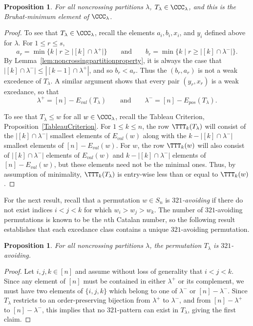 \documentclass[12pt]{amsart}
\newtheorem{prop}[equation]{Proposition}
\theoremstyle{definition}
\theoremstyle{remark}
\numberwithin{equation}{section}
\renewcommand{\setminus}{-}
\newcommand{\EP}{E_{pos}}
\newcommand{\EV}{E_{val}}
\begin{document}
\begin{prop}
\label{prop:321avoid}
For all noncrossing partitions $\lambda$, $T_{\lambda} \in \CCC_{\lambda}$, and this is the Bruhat-minimum element of $\CCC_{\lambda}$.
\end{prop}
\begin{proof}
To see that $T_{\lambda} \in \CCC_{\lambda}$, recall the elements $a_{i}, b_{i}, x_{i}$, and $y_{i}$ defined above for $\lambda$. For $1 \le r \le s$,
\[
a_{r} = \min\{ k  \;|\;  r \ge |[k] \cap \lambda^{+}| \}
\qquad\text{and}\qquad
b_{r} = \min\{ k  \;|\;  r \ge |[k] \cap \lambda^{-}| \}.
\]
By Lemma~\ref{lem:noncrossingpartitionproperty}, it is always the case that $|[k] \cap \lambda^{-}| \le |[k-1] \cap \lambda^{+}|$, and so $b_{r} < a_{r}$.  Thus the $(b_{r}, a_{r})$ is not a weak excedence of $T_{\lambda}$.  
A similar argument shows that every pair $(y_{r}, x_{r})$ is a weak excedance, so that 
\[
\lambda^{+} = [n] \setminus \EV(T_{\lambda})
\qquad\text{and}\qquad
\lambda^{-} =  [n] \setminus \EP(T_{\lambda}).
\]

To see that $T_{\lambda} \le w$ for all $w \in \CCC_{\lambda}$, recall the Tableau Criterion, Proposition~\ref{TableauCriterion}.  
For $1 \le k \le n$, the row $\TTT_{k}(T_{\lambda})$ will consist of the $|[k] \cap \lambda^{-}|$ smallest elements of $\EV(w)$ along with the $k - |[k] \cap \lambda^{-}|$ smallest elements of $[n] \setminus \EV(w)$.  
For $w$,  the row $\TTT_{k}(w)$ will also consist of $|[k] \cap \lambda^{-}|$ elements of $\EV(w)$ and $k - |[k] \cap \lambda^{-}|$ elements of $[n] \setminus \EV(w)$, but these elements need not be the minimal ones.  
Thus, by assumption of minimality, $\TTT_{k}(T_{\lambda})$ is entry-wise less than or equal to $\TTT_{k}(w)$.
\end{proof}

For the next result, recall that a permutation $w \in S_{n}$ is \emph{$321$-avoiding} if there do not exist indices $i < j < k$ for which $w_{i} > w_{j} > w_{k}$.  The number of $321$-avoiding permutations is known to be the $n$th Catalan number, so the following result establishes that each excedance class contains a unique $321$-avoiding permutation.

\begin{prop}
For all noncrossing partitions $\lambda$, the permutation $T_{\lambda}$ is $321$-avoiding.
\end{prop}
\begin{proof}
Let $i, j, k\in [n]$ and assume without loss of generality that $i < j < k$.  Since any element of $[n]$ must be contained in either $\lambda^{+}$ or its complement, we must have two elements of $\{i, j, k\}$ which belong to one of $\lambda^{-}$ or $[n] \setminus \lambda^{-}$.  Since $T_{\lambda}$ restricts to an order-preserving bijection from $\lambda^{+}$ to $\lambda^{-}$, and from $[n] \setminus \lambda^{+}$ to $[n] \setminus \lambda^{-}$, this implies that no $321$-pattern can exist in $T_{\lambda}$, giving the first claim.
\end{proof}
\end{document}
